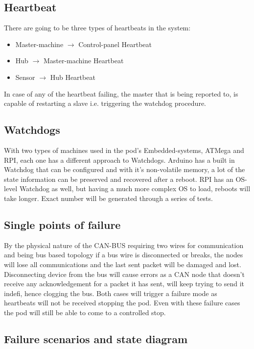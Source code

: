     \subsection{Heartbeat}
    There are going to be three types of heartbeats in the system:
    \begin{itemize}
      \item Master-machine $\rightarrow$ Control-panel Heartbeat
      \item Hub $\rightarrow$ Master-machine Heartbeat
      \item Sensor $\rightarrow$ Hub Heartbeat
    \end{itemize}
    
    In case of any of the heartbeat failing, the master that is being reported to, is capable of restarting a slave i.e. triggering the watchdog procedure.
    
	\subsection{Watchdogs}
    With two types of machines used in the pod's Embedded-systems, ATMega and RPI, each one has a different approach to Watchdogs. Arduino has a built in Watchdog that can be configured and with it's non-volatile memory, a lot of the state information can be preserved and recovered after a reboot. RPI has an OS-level Watchdog as well, but having a much more complex OS to load, reboots will take longer. Exact number will be generated through a series of tests.
   
    \subsection{Single points of failure}
    By the physical nature of the CAN-BUS requiring two wires for communication and being bus based topology if a bus wire is disconnected or breaks, the nodes will lose all communications and the last sent packet will be damaged and lost. Disconnecting device from the bus will cause errors as a CAN node that doesn't receive any acknowledgement for a packet it has sent, will keep trying to send it indefi, hence clogging the bus. Both cases will trigger a failure mode as heartbeats will not be received stopping the pod. Even with these failure cases the pod will still be able to come to a controlled stop. 
    
    \subsection {Failure scenarios and state diagram}
    
